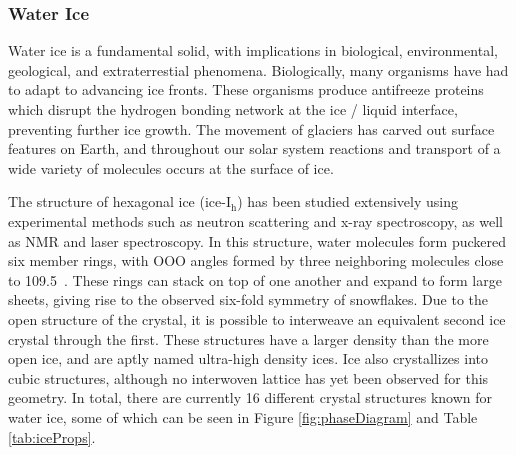 \subsubsection{Water Ice}
%
%
Water ice is a fundamental solid, with implications in biological,
environmental, geological, and extraterrestial
phenomena.\cite{Shultz2017} Biologically, many organisms have had to
adapt to advancing ice fronts. These organisms produce antifreeze
proteins which disrupt the hydrogen bonding network at the ice /
liquid interface, preventing further ice growth. The movement of
glaciers has carved out surface features on Earth, and throughout our
solar system reactions and transport of a wide variety of molecules
occurs at the surface of ice.


The structure of hexagonal ice (ice-I$_\mathrm{h}$) has been studied
extensively using experimental methods such as neutron scattering and
x-ray spectroscopy, as well as NMR and laser
spectroscopy.\cite{w. F. Kuhs and M. S. Lehmann, in Water Science
  Reviews 2, edited by F. Franks (Cambridge University, New York,
  1986),pp. 1-65.}  In this structure, water molecules form puckered
six member rings, with OOO angles formed by three neighboring
molecules close to 109.5\degree~. These rings can stack on top of one
another and expand to form large sheets, giving rise to the observed
six-fold symmetry of snowflakes. Due to the open structure of the
crystal, it is possible to interweave an equivalent second ice crystal
through the first. These structures have a larger density than the
more open ice, and are aptly named ultra-high density ices. Ice also
crystallizes into cubic structures, although no interwoven lattice has
yet been observed for this geometry. In total, there are currently 16
different crystal structures known for water ice, some of which can be
seen in Figure \ref{fig:phaseDiagram} and Table \ref{tab:iceProps}. 

